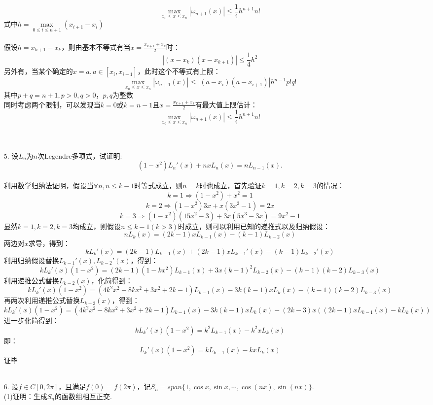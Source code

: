 \documentclass{article}
\begin{document}
\begin{itemize}
		$$\max\limits_{x_{0}\le x \le x_{n}}|\omega_{n+1}(x)|\le\frac{1}{4}h^{n+1}n!$$
		式中$h = \max\limits_{0 \le i \le n+1}(x_{i+1} - x_{i})$\\\\
		假设$h = x_{k+1} - x_{k}$，则由基本不等式有当$x = \frac{x_{k+1} + x_{k}}{2}$时：
		$$|(x - x_{k})(x - x_{k+1})| \le  \frac{1}{4}h^{2}$$
		另外有，当某个确定的$x = a, a\in[x_{i}, x_{i+1}]$，此时这个不等式有上限：
		$$\max\limits_{x_{0}\le x \le x_{n}}|\omega_{n+1}(x)| \le |(a - x_{i})(a - x_{i+1})|h^{n - 1}p!q!$$
		其中$p + q = n + 1, p > 0, q > 0$，$p, q$为整数\\
		同时考虑两个限制，可以发现当$k = 0$或$k = n-1$且$x = \frac{x_{k+1} + x_{k}}{2}$有最大值上限估计：
		$$\max\limits_{x_{0}\le x \le x_{n}}|\omega_{n+1}(x)| \le \frac{1}{4}h^{n+1}n!$$\\\\
		\item[5.]设$L_{n}$为$n$次Legendre多项式，试证明:
		$$
		(1-x^{2})L_{n}'(x) +nxL_{n}(x) = nL_{n-1}(x).
		$$\\
		利用数学归纳法证明，假设当$\forall n, n \le k-1$时等式成立，则$n = k$时也成立，首先验证$k = 1, k = 2,k= 3$的情况：
		$$k = 1 \Rightarrow (1-x^2)+ x^2 = 1$$
		$$k = 2 \Rightarrow (1-x^2)3x + x(3x^2 - 1) = 2x$$
		$$k = 3 \Rightarrow (1-x^2)(15x^2-3) + 3x(5x^3 - 3x) = 9x^2 - 1$$
		显然$k=1,k=2, k = 3$均成立，则假设$n \le k - 1(k > 3)$时成立，则可以利用已知的递推式以及归纳假设：
		$$nL_{k}(x) = (2k - 1)xL_{k-1}(x) - (k - 1)L_{k-2}(x)$$
		两边对$x$求导，得到：
		$$kL_{k}'(x) = (2k-1)L_{k-1}(x) + (2k-1)xL_{k-1}'(x) - (k-1)L_{k-2}'(x)$$
		利用归纳假设替换$L_{k - 1}'(x), L_{k-2}'(x)$，得到：
		$$kL_{k}'(x)(1-x^2) = (2k-1)(1-kx^2)L_{k-1}(x)+3x(k-1)^2L_{k-2}(x) - (k-1)(k-2)L_{k-3}(x)$$
		利用递推公式替换$L_{k-2}(x)$，化简得到：
		$$kL_{k}'(x)(1-x^2) = (4k^2x^2-8kx^2+3x^2+2k - 1)L_{k-1}(x) - 3k(k-1)xL_{k}(x) - (k-1)(k-2)L_{k-3}(x)$$
		再两次利用递推公式替换$L_{k-3}(x)$，得到：
		$$kL_{k}'(x)(1-x^2) = (4k^2x^2-8kx^2+3x^2+2k - 1)L_{k-1}(x) - 3k(k-1)xL_{k}(x) - (2k-3)x((2k-1)xL_{k-1}(x) - kL_k(x))$$
		进一步化简得到：
		$$kL_{k}'(x)(1-x^2) =k^2L_{k-1}(x) - k^2xL_{k}(x) $$
		即：
		$$L_{k}'(x)(1-x^2) =kL_{k-1}(x) - kxL_{k}(x) $$
		证毕\\\\
		\item[6.]设$f\in C[0, 2\pi]$，且满足$f(0) = f(2\pi)$，记$S_{n} = span\{1,\cos x, \sin x, \cdots, \cos(nx), \sin(nx)\}.$\\
		(1)证明：生成$S_{n}$的函数组相互正交.\\

\end{itemize}
\end{document}
